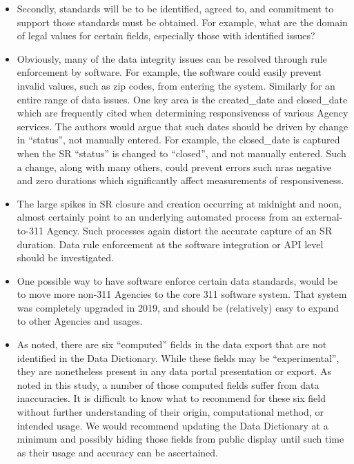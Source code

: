 \documentclass[12pt, titlepage]{article}
\begin{document}
{\begin{itemize}
	\item Secondly, standards will be to be identified, agreed to, and commitment to support those standards must be
	obtained. For example, what are the domain of legal values for certain fields, especially those with identified issues?

	\item Obviously, many of the data integrity issues can be resolved through rule enforcement by software. 
	For example, the software could easily prevent invalid values, such as zip codes, 
	from entering the system. Similarly for an entire range of data issues. One key area is the
	created\_date and closed\_date which are frequently cited when determining 
	responsiveness of various Agency services. The authors would argue that such dates 
	should be driven by change in ``status'', not manually entered. For example, the closed\_date is captured
	when the SR ``status'' is changed to ``closed'', and not manually entered. Such a change, along with many others, could prevent errors such
	nras negative and  zero durations which significantly affect measurements of responsiveness. 
	
	\item The large spikes in SR closure and creation occurring at midnight and noon, almost certainly point to an underlying automated
	process from an external-to-311 Agency. Such processes again distort the accurate capture of an SR duration. Data rule enforcement
	at the software integration or API level should be investigated.

	\item One possible way to have software enforce certain data standards, would be to move more non-311 Agencies to the core 311
	software system. That system was completely upgraded in 2019, and should be (relatively) easy to expand to other Agencies and usages.
	
	\item As noted, there are six ``computed'' fields in the data export that are not identified in the Data Dictionary. While these fields may be
	``experimental'', they are nonetheless present in any data portal presentation or export. As noted in this study, a number of those computed
	fields suffer from data inaccuracies. It is difficult to know what to recommend for these six field without further understanding
	of their origin, computational method, or intended usage. We would recommend updating the Data Dictionary at a minimum and
	possibly hiding those fields from public display until such time as their usage and accuracy can be ascertained.
	

\end{itemize}}
\end{document}

